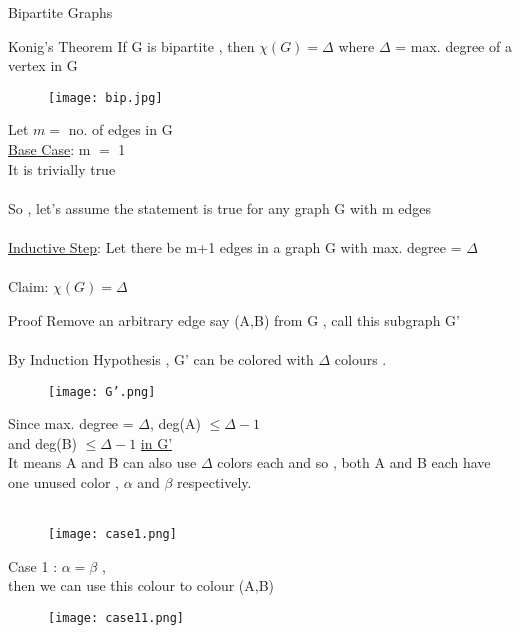 \documentclass[12pt]{beamer}
\begin{document}
\begin{frame}{Bipartite Graphs}
\begin{block}{Konig's Theorem}
If G is bipartite , then $\chi(G) = \Delta$ where $\Delta$ = max. degree of a vertex in G
\end{block}

\begin{figure}
\texttt{[image: bip.jpg]}
\end{figure}
\end{frame}

\begin{frame}
Let $m = $ no. of edges in G \\
\underline{Base Case}: m $=$ 1\\
It is trivially true \\~\\

So , let's assume the statement is true for any graph G with m edges\\~\\
\underline{Inductive Step}: Let there be m+1 edges in a graph G with max. degree = $\Delta$ \\~\\
Claim: $\chi(G) = \Delta$
\end{frame}

\begin{frame}{Proof}
Remove an arbitrary edge say (A,B) from G , call this subgraph G'\\~\\
By Induction Hypothesis , G' can be colored with $\Delta$ colours .

\begin{figure}
\texttt{[image: G'.png]}
\end{figure}
\end{frame}

\begin{frame}

Since max. degree = $\Delta$, deg(A) $\leq \Delta - 1$\\
and deg(B) $\leq \Delta - 1$ \underline{in G'} \\
It means A and B can also use $\Delta$ colors each and so , both A and B each have one unused color , $\alpha$ and $\beta$ respectively.\\~\\

\begin{figure}
\texttt{[image: case1.png]}
\end{figure}

Case 1 : $\alpha = \beta$ ,\\

then we can use this colour to colour (A,B)

\begin{figure}
\texttt{[image: case11.png]}
\end{figure}
\end{frame}
\end{document}
